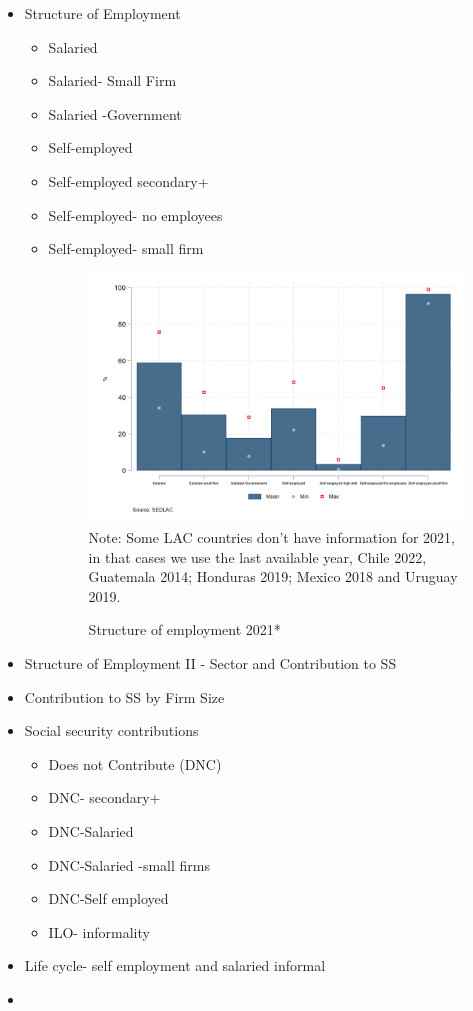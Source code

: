 \documentclass[english]{article}
\begin{document}
\begin{itemize}
\begin{itemize}
    \end{itemize}
    \item Structure of Employment
    \begin{itemize}
        \item Salaried
        \item Salaried- Small Firm
        \item Salaried -Government
        \item Self-employed 
        \item Self-employed secondary+
        \item Self-employed- no employees
        \item Self-employed- small firm
        \begin{figure}[!htb]
        \centering
        \caption{Structure of employment 2021*}     
        \includegraphics[scale=.3]{latex/figures/Snapshot/Structure of employment.png}
        \label{fig:Structure of employment}
        \footnotesize{Note: Some LAC countries don’t have information for 2021, in that cases we use the last available year, Chile 2022, Guatemala 2014; Honduras 2019; Mexico 2018 and Uruguay 2019.}
        \end{figure}

        
    \end{itemize}
\item Structure of Employment II - Sector and Contribution to SS
    \item Contribution to SS by Firm Size
        \item Social security contributions
    \begin{itemize}
        \item Does not Contribute (DNC) 
        \item DNC- secondary+
        \item DNC-Salaried
        \item DNC-Salaried -small firms
        \item DNC-Self employed
        \item ILO- informality
    \end{itemize}


\item Life cycle- self employment and salaried informal
\item 
\end{itemize}
\end{document}

